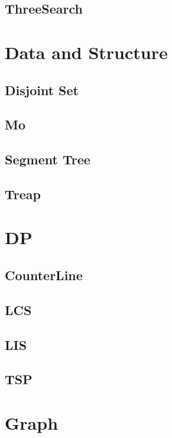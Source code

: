 \subsection{ThreeSearch}


\section{Data and Structure}

\subsection{Disjoint Set}

\subsection{Mo}

\subsection{Segment Tree}

\subsection{Treap}


\section{DP}

\subsection{CounterLine}

\subsection{LCS}

\subsection{LIS}

\subsection{TSP}


\section{Graph}

